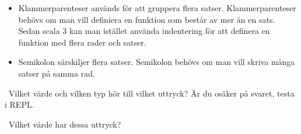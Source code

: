 \SubtaskSolved
\begin{itemize}
\item Klammerparenteser används för att gruppera flera satser. 
Klammerparenteser behövs om man vill definiera en funktion som består av mer än en sats. 
Sedan scala 3 kan man istället använda indentering för att definera en funktion med flera rader och satser.

\item Semikolon särskiljer flera satser. Semikolon behövs om man vill skriva många satser på samma rad.


\end{itemize}

\QUESTEND





\QUESTBEGIN

\Task \what~Vilket värde och vilken typ hör till vilket uttryck?  Är du osäker på svaret, testa i REPL.

\begin{ConceptConnections}[0.3\textwidth]

\end{ConceptConnections}

\SOLUTION

\TaskSolved \what

\begin{ConceptConnections}[0.3\textwidth]

\end{ConceptConnections}

\QUESTEND






\QUESTBEGIN

\Task \what~Vilket värde har dessa uttryck?  %

\Subtask {}

\Subtask {}

\Subtask {}

\Subtask {}


\Subtask {}

\Subtask {}

\Subtask {}


\Subtask {}

\Subtask {}

